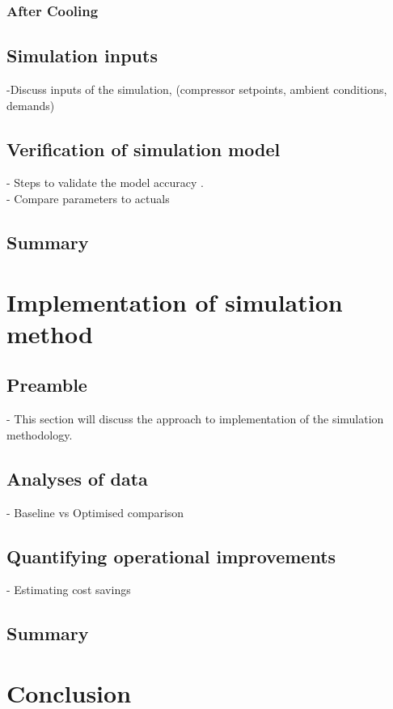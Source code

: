 		\subsubsection{After Cooling}
	\subsection{Simulation inputs}
		-Discuss inputs of the simulation, (compressor setpoints, ambient conditions, demands)
	\subsection{Verification of simulation model}
		- Steps to validate  the model accuracy .\\
		- Compare parameters to actuals
	\subsection{Summary}
\section{Implementation of simulation method}
	\subsection{Preamble}
		- This section will discuss the approach to implementation of the simulation methodology.
	\subsection{Analyses of data}
		- Baseline vs Optimised comparison \\
	\subsection{Quantifying operational improvements}
		- Estimating cost savings
	\subsection{Summary}
\section{Conclusion}
